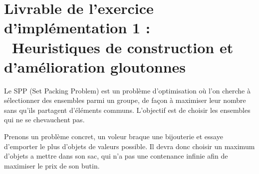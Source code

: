 \usepackage{listings}
\section*{Livrable de l'exercice d'implémentation  1 : \\ Heuristiques de construction et d'amélioration gloutonnes}

%
%

\vspace{5mm}
\noindent
{}
\vspace{2mm}

\noindent
Le SPP (Set Packing Problem) est un problème d'optimisation où l'on cherche à sélectionner des ensembles parmi un groupe, de façon à maximiser leur nombre sans qu'ils partagent d'éléments communs. L'objectif est de choisir les ensembles qui ne se chevauchent pas.

\vspace{0,5mm}
\noindent
Prenons un problème concret, un voleur braque une bijouterie et essaye d'emporter le plus d'objets de valeurs possible. Il devra donc choisir un maximum d'objets a mettre dans son sac, qui n'a pas une contenance infinie afin de maximiser le prix de son butin.



%
%

\vspace{5mm}
\noindent
{}
\vspace{2mm}

